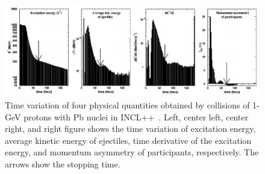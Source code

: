 \begin{figure}[H]
	\centering
	\includegraphics[width=16cm]{Figures/Model/INCL_time}
	\caption[Time variation of four physical quantities obtained by collisions of 1-GeV protons with Pb nuclei in INCL++]{
	Time variation of four physical quantities obtained by collisions of 1-GeV protons with Pb nuclei in INCL++~\cite{2002Boudard}.
	Left, center left, center right, and right figure shows the time variation of excitation energy, average kinetic energy of ejectiles, time derivative of the excitation energy, and momentum asymmetry of participants, respectively.
	The arrows show the stopping time.
	}\label{INCL_time}
\end{figure}

